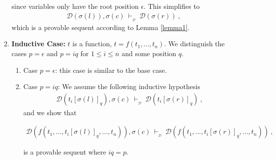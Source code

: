 \documentclass[copyright]{eptcs}
\begin{document}
\begin{enumerate}
\begin{enumerate}
since variables only have the root position $\epsilon$. This simplifies to 
\begin{eqnarray*}
\mathcal{D}(\sigma(l)), \sigma(c)~\vdash_{_\mathcal{D}}~\mathcal{D}(\sigma(r))~,
\end{eqnarray*}
which is a provable sequent according to Lemma \ref{lemma1}.
\item \textbf{Inductive Case:} $t$ is a function, $t = f(t_1,...,t_n)$. We distinguish the cases $p=\epsilon$ and $p=iq$ for $1\leq i\leq n$ and some position $q$.
\begin{enumerate}
\item Case $p=\epsilon$: this case is similar to the base case.
\item Case $p=iq$: We assume the following inductive hypothesis
\begin{eqnarray*}
\mathcal{D}(t_i[\sigma(l)]_q), \sigma(c)~\vdash_{_\mathcal{D}}~\mathcal{D}(t_i[\sigma(r)]_q)~,
\end{eqnarray*}
and we show that
\begin{small}
\begin{eqnarray*}
\mathcal{D}(f(t_1,...,t_i[\sigma(l)]_q,...,t_n)), \sigma(c)~\vdash_{_\mathcal{D}}~
\mathcal{D}(f(t_1,...,t_i[\sigma(r)]_q,...,t_n))~,
\end{eqnarray*}
\end{small}
is a provable sequent where $iq=p$.
\end{enumerate}
\end{enumerate}
\end{enumerate}
\end{document}
